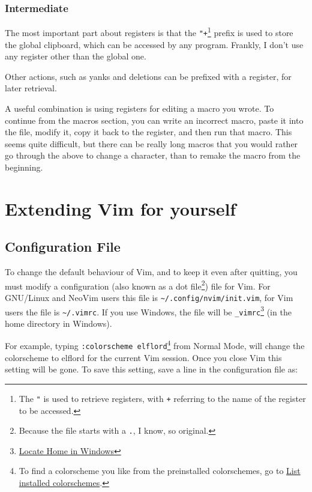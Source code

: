 \documentclass[11pt]{article}
\begin{document}
\subsubsection{Intermediate}
\label{sec:orgde40c3c}
The most important part about registers is that the \texttt{"+}\footnote{The \texttt{"} is used to retrieve registers, with \texttt{+} referring to the name
of the register to be accessed.} prefix is used to store
the global clipboard, which can be accessed by any program. Frankly, I
don't use any register other than the global one.

Other actions, such as yanks and deletions can be prefixed with a register, for
later retrieval.

A useful combination is using registers for editing a macro you wrote. To
continue from the macros section, you can write an incorrect macro, paste it
into the file, modify it, copy it back to the register, and then run that macro.
This seems quite difficult, but there can be really long macros that you would
rather go through the above to change a character, than to remake the macro
from the beginning.
\section{Extending Vim for yourself}
\label{sec:org0d343bd}
\subsection{Configuration File}
\label{sec:org0e63926}
To change the default behaviour of Vim, and to keep it even after quitting, you
must modify a configuration (also known as a dot file\footnote{Because the file starts with a \texttt{.}, I know, so original.}) file for Vim. For
GNU/Linux and NeoVim users this file is \texttt{\textasciitilde{}/.config/nvim/init.vim}, for Vim users
the file is \texttt{\textasciitilde{}/.vimrc}. If you use Windows, the file will be \texttt{\_vimrc}\footnote{\href{https://superuser.com/questions/86246/where-should-the-vimrc-file-be-located-on-windows-7}{Locate Home in Windows}} (in
the home directory in Windows).

For example, typing \texttt{:colorscheme elflord}\footnote{To find a colorscheme you like from the preinstalled colorschemes, go to \href{https://stackoverflow.com/questions/7331940/how-to-get-the-list-of-all-installed-color-schemes-in-vim}{List
installed colorschemes}.} from Normal Mode, will change
the colorscheme to elflord for the current Vim session. Once you close Vim this
setting will be gone. To save this setting, save a line in the configuration
file as:
\end{document}
